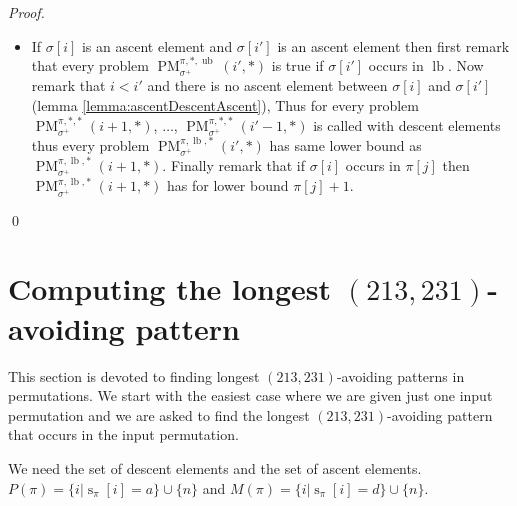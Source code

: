 \documentclass[a4paper]{llncs}
\newcommand{\ptext}{\pi}
\newcommand{\pmotif}{\sigma}
\DeclareMathOperator{\stripea}{s}
\newcommand{\stripe}[2]{\stripea_{{#1}}[{#2}]}
\newcounter{num}
\newcommand{\dstep}{d}
\newcommand{\ustep}{a}
\newcommand{\pbmotif}{\pmotif^+}
\DeclareMathOperator{\PMa}{PM}
\newcommand{\PM}[6]{\PMa_{{#1}}^{{#2},{#3},{#4}}({#5},{#6})}
\DeclareMathOperator{\lb}{lb}
\DeclareMathOperator{\ub}{ub}
\begin{document}
\begin{proof}
\begin{itemize}
\begin{itemize}
			\item If $\pmotif[i]$ is an ascent element and $\pmotif[i']$ is an ascent element then
			first remark that every problem 
			$\PM{\pbmotif}{\ptext}{*}{\ub}{i'}{*}$ is true if $\sigma[i']$ occurs in $\lb$.
			Now remark that
			$i<i'$ and there is no  ascent element between $\pmotif[i]$ and $\pmotif[i']$ (lemma \ref{lemma:ascentDescentAscent}), 
			Thus for every problem $\PM{\pbmotif}{\ptext}{*}{*}{i+1}{*}$, $\dots$, $\PM{\pbmotif}{\ptext}{*}{*}{i'-1}{*}$ is called with descent elements
			thus every problem 
			$\PM{\pbmotif}{\ptext}{\lb}{*}{i'}{*}$ has same lower bound as $\PM{\pbmotif}{\ptext}{\lb}{*}{i+1}{*}$.
			Finally remark that if $\pmotif[i]$ occurs in $\ptext[j]$ then  $\PM{\pbmotif}{\ptext}{\lb}{*}{i+1}{*}$ has for lower bound $\ptext[j]+1$.			

		\end{itemize}
\end{itemize}
\qed
\end{proof}



\section{Computing the longest $(213,231)$-avoiding pattern}
\label{section:LCS}

	This section is devoted to finding longest $(213,231)$-avoiding patterns 
	in permutations.
	We start with the easiest case where we are given just one input permutation
	and we are asked to find the longest $(213,231)$-avoiding pattern that 
	occurs in the input permutation.

	We need the set of descent elements and the set of ascent elements.
	$P(\pi) = \{i | \stripe{\pi}{i} = \ustep \} \cup \{n\}$ and
	$M(\pi) = \{i | \stripe{\pi}{i} = \dstep \} \cup \{n\}$.\\
\end{document}
